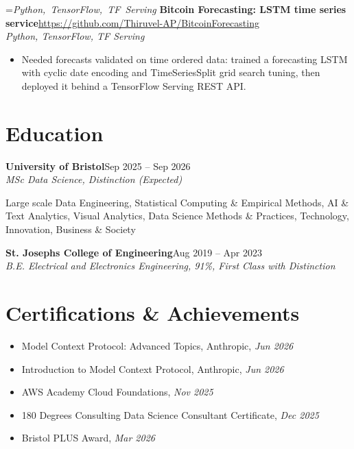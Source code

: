 \documentclass[a4paper,11pt]{article}
\newcommand{\roleNoLoc}[3]{\textbf{#1}\hfill{\color{muted}#2}\\ \textit{#3}\par}
\newcommand{\project}[3]{%
  \textbf{#1}\hfill#3\\ {\color{muted}\small\textit{#2}}\par}
\newcommand{\gap}{\vspace{5pt}}
\begin{document}
=\hbox{{\small\textit{Python, TensorFlow, TF Serving}}}%
\ifdim\wd0>\linewidth
\ifdim\wd2>\linewidth
\textbf{Bitcoin Forecasting: LSTM time series service}\\ {\color{muted}\small\textit{Python, TensorFlow, TF Serving}}\\ \hspace*{\fill}{\small\url{https://github.com/Thiruvel-AP/BitcoinForecasting}}\par
\else
\textbf{Bitcoin Forecasting: LSTM time series service}\\ {\color{muted}\small\textit{Python, TensorFlow, TF Serving}}\hfill{\small\url{https://github.com/Thiruvel-AP/BitcoinForecasting}}\par
\fi
\else
\project{Bitcoin Forecasting: LSTM time series service}{Python, TensorFlow, TF Serving}{\url{https://github.com/Thiruvel-AP/BitcoinForecasting}}
\fi
\begin{itemize}
  \item Needed forecasts validated on time ordered data: trained a forecasting LSTM with cyclic date encoding and TimeSeriesSplit grid search tuning, then deployed it behind a TensorFlow Serving REST API.
\end{itemize}

\section{Education}
\roleNoLoc{University of Bristol}{Sep 2025 – Sep 2026}{MSc Data Science, Distinction \textit{(Expected)}}
{\color{muted}\small Large scale Data Engineering, Statistical Computing \& Empirical Methods, AI \& Text Analytics, Visual Analytics, Data Science Methods \& Practices, Technology, Innovation, Business \& Society}\par
\gap
{}
\roleNoLoc{St. Joseph\textquotesingle{}s College of Engineering}{Aug 2019 – Apr 2023}{B.E. Electrical and Electronics Engineering, 91\%, First Class with Distinction}

\section{Certifications \& Achievements}
\begin{itemize}
  \item Model Context Protocol: Advanced Topics, Anthropic, \textit{Jun 2026}
  \item Introduction to Model Context Protocol, Anthropic, \textit{Jun 2026}
  \item AWS Academy Cloud Foundations, \textit{Nov 2025}
  \item 180 Degrees Consulting Data Science Consultant Certificate, \textit{Dec 2025}
  \item Bristol PLUS Award, \textit{Mar 2026}
\end{itemize}
\end{document}
